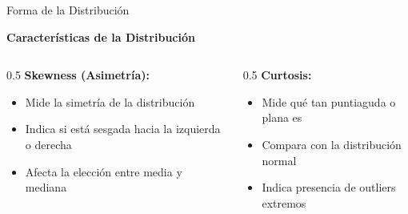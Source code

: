 \documentclass{beamer}
\begin{document}
\begin{frame}{Forma de la Distribución}
    \begin{center}
        \textbf{Características de la Distribución}
    \end{center}
    
    \vspace{0.5cm}
    
    \begin{columns}
        \begin{column}{0.5\textwidth}
            \textbf{Skewness (Asimetría):}
            \begin{itemize}
                \item Mide la simetría de la distribución
                \item Indica si está sesgada hacia la izquierda o derecha
                \item Afecta la elección entre media y mediana
            \end{itemize}
        \end{column}
        \begin{column}{0.5\textwidth}
            \textbf{Curtosis:}
            \begin{itemize}
                \item Mide qué tan puntiaguda o plana es
                \item Compara con la distribución normal
                \item Indica presencia de outliers extremos
            \end{itemize}
        \end{column}
    \end{columns}
\end{frame}
\end{document}
